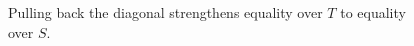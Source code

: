 \begin{figure}[ht]\centering
{}
\caption{Pulling back the diagonal strengthens equality over $T$ to equality over $S$.}\label{fig:vi23-08}\end{figure}
